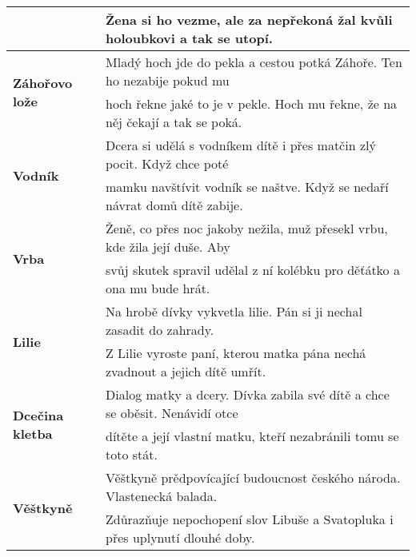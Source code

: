 \begin{tabularx}{\linewidth}{l|l}
                                               & Žena si ho vezme, ale za nepřekoná žal kvůli holoubkovi a tak se utopí.       \\
  \hline
  \multirow{2}{15em}{\textbf{Záhořovo lože}}   & Mladý hoch jde do pekla a cestou potká Záhoře. Ten ho nezabije pokud mu       \\
                                               & hoch řekne jaké to je v pekle. Hoch mu řekne, že na něj čekají a tak se poká. \\
  \hline
  \multirow{2}{15em}{\textbf{Vodník}}          & Dcera si udělá s vodníkem dítě i přes matčin zlý pocit. Když chce poté        \\
                                               & mamku navštívit vodník se naštve. Když se nedaří návrat domů dítě zabije.     \\
  \hline
  \multirow{2}{15em}{\textbf{Vrba}}            & Ženě, co přes noc jakoby nežila, muž přesekl vrbu, kde žila její duše. Aby    \\
                                               & svůj skutek spravil udělal z ní kolébku pro děťátko a ona mu bude hrát.       \\
  \hline
  \multirow{2}{15em}{\textbf{Lilie}}           & Na hrobě dívky vykvetla lilie. Pán si ji nechal zasadit do zahrady.           \\
                                               & Z Lilie vyroste paní, kterou matka pána nechá zvadnout a jejich dítě umřít.   \\
  \hline
  \multirow{2}{15em}{\textbf{Dcečina kletba}}  & Dialog matky a dcery. Dívka zabila své dítě a chce se oběsit. Nenávidí otce   \\
                                               & dítěte a její vlastní matku, kteří nezabránili tomu se toto stát.             \\
  \hline
  \multirow{2}{15em}{\textbf{Věštkyně}}        & Věštkyně prědpovícající budoucnost českého národa. Vlastenecká balada.        \\
                                               & Zdůrazňuje nepochopení slov Libuše a Svatopluka i přes uplynutí dlouhé doby.  \\
\end{tabularx}

